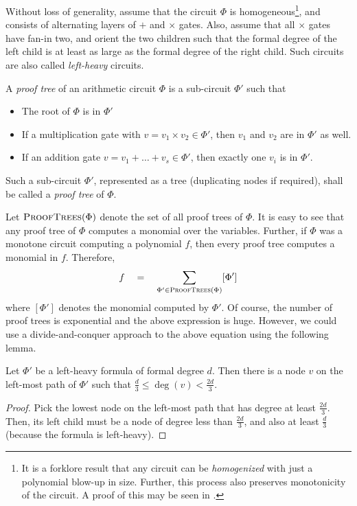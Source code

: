 Without loss of generality, assume that the circuit $\Phi$ is
homogeneous\footnote{It is a forklore result that any circuit can be \emph{homogenized} with just a polynomial blow-up in size. Further, this process also preserves monotonicity of the circuit. A proof of this may be seen in \cite{sy}.}, and consists of alternating layers of $+$ and $\times$
gates. Also, assume that all $\times$ gates have fan-in two, and
orient the two children such that the formal degree of the left child
is at least as large as the formal degree of the right child. Such
circuits are also called \emph{left-heavy} circuits.

\begin{definition}\label{defn:prooftree}
A \emph{proof tree} of an arithmetic circuit $\Phi$ is a sub-circuit $\Phi'$ such that
\begin{itemize}
\item The root of $\Phi$ is in $\Phi'$
\item If a multiplication gate with $v = v_1\times v_2 \in \Phi'$, then $v_1$ and $v_2$ are in $\Phi'$ as well.
\item If an addition gate $v = v_1 + \dots + v_s \in \Phi'$, then
  exactly one $v_i$ is in $\Phi'$.
\end{itemize}
Such a sub-circuit $\Phi'$, represented as a tree (duplicating nodes if
required), shall be called a \emph{proof tree} of $\Phi$.
\end{definition}

\newcommand{\PF}{\textsc{ProofTrees}}

Let $\PF(\Phi)$ denote the set of all proof trees of $\Phi$. It is
easy to see that any proof tree of $\Phi$ computes a monomial over the
variables. Further, if $\Phi$ was a monotone circuit computing a polynomial
$f$, then every proof tree computes a monomial in $f$. Therefore,
$$
f\quad=\quad \sum_{\Phi' \in \PF(\Phi)} [\Phi']
$$
where $[\Phi']$ denotes the monomial computed by $\Phi'$. Of course, the number of proof trees is exponential and the above
expression is huge. However, we could use a divide-and-conquer
approach to the above equation using the following lemma. 

\begin{lemma}\label{lem:brent-two-thirds}
  Let $\Phi'$ be a left-heavy formula of formal degree $d$. Then there
  is a node $v$ on the left-most path of $\Phi'$ such that
  $\frac{d}{3}\leq \deg(v)< \frac{2d}{3}$.
\end{lemma}
\begin{proof}
  Pick the lowest node on the left-most path that has degree at least
  $\frac{2d}{3}$. Then, its left child must be a node of degree less
  than $\frac{2d}{3}$, and also at least $\frac{d}{3}$ (because the
  formula is left-heavy). 
\end{proof}

